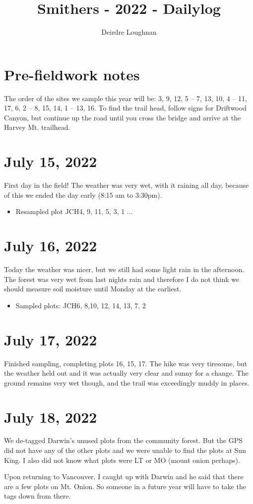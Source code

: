 \documentclass{article}\usepackage[]{graphicx}\usepackage[]{color}
\title{Smithers - 2022 - Dailylog}
\author{Deirdre Loughnan}
\begin{document}
\maketitle
\section{Pre-fieldwork notes}

The order of the sites we sample this year will be:  3,  9, 12, 5  -- 7, 13, 10,  4 -- 11, 17, 6, 2 --  8, 15, 14, 1 -- 13, 16. To find the trail head, follow signs for Driftwood Canyon, but continue up the road until you cross the bridge and arrive at the Harvey Mt. trailhead. 

\section{July 15, 2022}

First day in the field! The weather was very wet, with it raining all day, because of this we ended the day early (8:15 am to 3:30pm).

\begin{itemize}
\item Resampled plot JCH4, 9, 11, 5, 3, 1 ...
\end{itemize}
\section{July 16, 2022}

Today the weather was nicer, but we still had some light rain in the afternoon. The forest was very wet from last nights rain and therefore I do not think we should measure soil moisture until Monday at the earliest.

\begin{itemize}
\item Sampled plots: JCH6, 8,10, 12, 14, 13, 7, 2
\end {itemize}

\section{July 17, 2022}

Finished sampling, completing plots 16, 15, 17. The hike was very tiresome, but the weather held out and it was actually very clear and sunny for a change. The ground remains very wet though, and the trail was exceedingly muddy in places. 

\section{July 18, 2022}

We de-tagged Darwin's unused plots from the community forest. But the GPS did not have any of the other plots and we were unable to find the plots at Sun King. I also did not know what plots were LT or MO (mount onion perhaps).

Upon returning to Vancouver, I caught up with Darwin and he said that there are a few plots on Mt. Onion. So someone in a future year will have to take the tags down from there.
\end{document}

